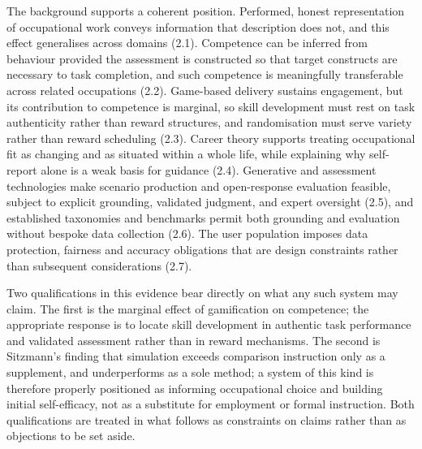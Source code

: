The background supports a coherent position. Performed, honest representation of occupational work conveys information that description does not, and this effect generalises across domains (2.1). Competence can be inferred from behaviour provided the assessment is constructed so that target constructs are necessary to task completion, and such competence is meaningfully transferable across related occupations (2.2). Game-based delivery sustains engagement, but its contribution to competence is marginal, so skill development must rest on task authenticity rather than reward structures, and randomisation must serve variety rather than reward scheduling (2.3). Career theory supports treating occupational fit as changing and as situated within a whole life, while explaining why self-report alone is a weak basis for guidance (2.4). Generative and assessment technologies make scenario production and open-response evaluation feasible, subject to explicit grounding, validated judgment, and expert oversight (2.5), and established taxonomies and benchmarks permit both grounding and evaluation without bespoke data collection (2.6). The user population imposes data protection, fairness and accuracy obligations that are design constraints rather than subsequent considerations (2.7).

Two qualifications in this evidence bear directly on what any such system may claim. The first is the marginal effect of gamification on competence\cite{r33}; the appropriate response is to locate skill development in authentic task performance and validated assessment rather than in reward mechanisms. The second is Sitzmann's finding that simulation exceeds comparison instruction only as a supplement, and underperforms as a sole method\cite{r36}; a system of this kind is therefore properly positioned as informing occupational choice and building initial self-efficacy, not as a substitute for employment or formal instruction. Both qualifications are treated in what follows as constraints on claims rather than as objections to be set aside.
